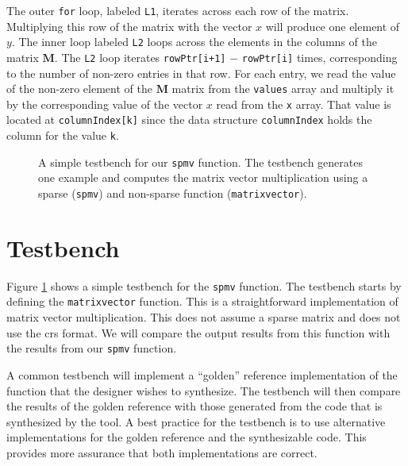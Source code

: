 The outer \lstinline{for} loop, labeled \lstinline{L1}, iterates across each row of the matrix. Multiplying this row of the matrix with the vector $x$ will produce one element of $y$.  The inner loop labeled \lstinline{L2} loops across the elements in the columns of the matrix $\mathbf{M}$. The \lstinline{L2} loop iterates \lstinline{rowPtr[i+1]} $-$ \lstinline{rowPtr[i]} times, corresponding to the number of non-zero entries in that row. For each entry, we read the value of the non-zero element of the $\mathbf{M}$ matrix from the \lstinline{values} array and multiply it by the corresponding value of the vector $x$ read from the \lstinline{x} array. That value is located at \lstinline{columnIndex[k]} since the data structure \lstinline{columnIndex} holds the column for the value \lstinline{k}. 

\begin{figure}

\caption{  A simple testbench for our \lstinline{spmv} function. The testbench generates one example and computes the matrix vector multiplication using a sparse (\lstinline{spmv}) and non-sparse function (\lstinline{matrixvector}).}
\label{fig:spmv_test}
\end{figure}

\section{Testbench}

Figure \ref{fig:spmv_test} shows a simple testbench for the \lstinline{spmv} function. The testbench starts by defining the \lstinline{matrixvector} function. This is a straightforward implementation of matrix vector multiplication. This does not assume a sparse matrix and does not use the \gls{crs} format. We will compare the output results from this function with the results from our \lstinline{spmv} function. 

\begin{aside}
A common testbench will implement a ``golden'' reference implementation of the function that the designer wishes to synthesize. The testbench will then compare the results of the golden reference with those generated from the code that is synthesized by the \VHLS tool. A best practice for the testbench is to use alternative implementations for the golden reference and the synthesizable code. This provides more assurance that both implementations are correct. 
\end{aside}

